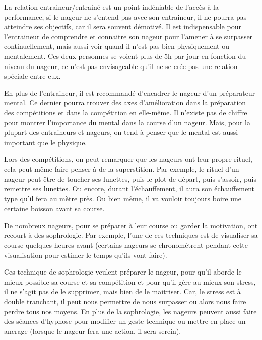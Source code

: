 \vspace{12pt}

La relation entraineur/entrainé est un point indéniable de l'accès à la performance, si le nageur ne s'entend pas avec son entraineur, il ne pourra pas atteindre ses objectifs, car il sera souvent démotivé. Il est indispensable pour l'entraineur de comprendre et connaitre son nageur pour l'amener à se surpasser continuellement, mais aussi voir quand il n'est pas bien physiquement ou mentalement. Ces deux personnes se voient plus de 5h par jour en fonction du niveau du nageur, ce n'est pas envisageable qu'il ne se crée pas une relation spéciale entre eux.

\vspace{12pt}

En plus de l'entraineur, il est recommandé d'encadrer le nageur d'un préparateur mental. Ce dernier pourra trouver des axes d'amélioration dans la préparation des compétitions et dans la compétition en elle-même. Il n'existe pas de chiffre pour montrer l'importance du mental dans la course d'un nageur. Mais, pour la plupart des entraineurs et nageurs, on tend à penser que le mental est aussi important que le physique.

\vspace{12pt}

Lors des compétitions, on peut remarquer que les nageurs ont leur propre rituel, cela peut même faire penser à de la superstition. Par exemple, le rituel d'un nageur peut être de toucher ses lunettes, puis le plot de départ, puis s'assoir, puis remettre ses lunettes. Ou encore, durant l'échauffement, il aura son échauffement type qu'il fera au mètre près. Ou bien même, il va vouloir toujours boire une certaine boisson avant sa course.

\vspace{12pt}

De nombreux nageurs, pour se préparer à leur course ou garder la motivation, ont recourt à des \gls{sophrologie}. Par exemple, l'une de ces techniques est de visualiser sa course quelques heures avant (certains nageurs se chronomètrent pendant cette visualisation pour estimer le temps qu'ils vont faire).

Ces technique de \gls{sophrologie} veulent préparer le nageur, pour qu'il aborde le mieux possible sa course et sa compétition et pour qu'il gère au mieux son stress, il ne s'agit pas de le supprimer, mais bien de le maitriser. Car, le stress est à double tranchant, il peut nous permettre de nous surpasser ou alors nous faire perdre tous nos moyens. En plus de la sophrologie, les nageurs peuvent aussi faire des séances d'hypnose pour modifier un geste technique ou mettre en place un ancrage (lorsque le nageur fera une action, il sera serein).

